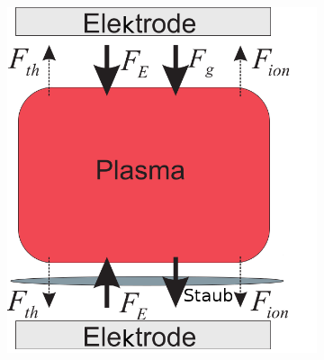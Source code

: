 \documentclass[numbers=noenddot,a4paper]{scrartcl}
\newcommand{\tenpo}[1]{ 10^{#1}}
\newcommand{\ix}[1]{_\text{#1}}
\newcommand{\grad}[1]{\textit{grad}\left(#1\right)}
\begin{document}

				\begin{figure}
					\centering
					\begin{subfigure}[b]{0.45\textwidth}
						\hspace{0.3cm}
						\includegraphics[width=\textwidth,height=\textwidth]{figs/directionsofforcesandtrappingmelzerlinks.png}
						\caption{}
						\label{img:linksdirection}
					\end{subfigure}
					\begin{subfigure}[b]{0.45\textwidth}
						\hspace{-0.2cm}

\end{subfigure}
\end{figure}
\end{document}
